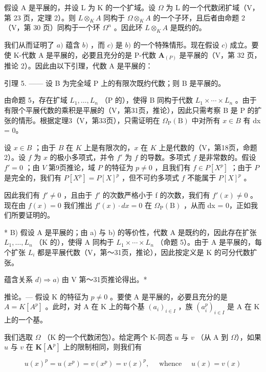 假设 A 是平展的，并设 L 为 K 的一个扩域。设 \(\Omega\) 为 L 的一个代数闭扩域（V，第 23 页，定理 2）。则 \(L \otimes_{K} A\) 同构于 \(\Omega \otimes_{K} A\) 的一个子环，且后者由命题 2（V，第 30 页）同构于一个环 \(\Omega^{n}\) 。因此环 \(L \otimes_{K} A\) 是既约的。

我们从而证明了 \(a)\) 蕴含 \(b)\) ，而 \(c)\) 是 \(b)\) 的一个特殊情形。现在假设 \(c)\) 成立。要使 K-代数 A 是平展的，必要且充分的是 P-代数 \(\mathbf{A}_{(P)}\) 是平展的（V，第 32 页，推论 2）。因此由以下引理，代数 A 是平展的：

引理 5. —— 设 B 为完全域 P 上的有限次既约代数；则 B 是平展的。

由命题 5，存在扩域 \(L_{1}, \ldots, L_{n}\) （P 的），使得 B 同构于代数 \(L_{1} \times \cdots \times L_{n}\) 。由于有限个平展代数的乘积是平展的（V，第31页，推论），因此只需考察 B 是 P 的扩张的情形。根据定理3（V，第33页），只需证明在 \(\Omega_{\mathrm{P}}(\mathrm{B})\) 中对所有 \(x \in B\) 有 dx = 0。

设 \(x \in B\) ；由于 \(B\) 在 \(K\) 上是有限次的，\(x\) 在 \(K\) 上是代数的（V，第18页，命题2）。设 \(f\) 为 \(x\) 的极小多项式，并令 \(f'\) 为 \(f\) 的导数。多项式 \(f\) 是非常数的。假设 \(f' = 0\) ；由 \(V\) 第9页推论，域 \(P\) 的特征为 \(p \neq 0\) ，且我们有 \(f \in P[X^p]\) ；由于 \(P\) 是完全的，我们有 \(P[X^p] = P[X]^p\) ，但不可约多项式 \(f\) 不能属于 \(P[X]^p\) 。

因此我们有 \(f' \neq 0\) ，且由于 \(f'\) 的次数严格小于 f 的次数，我们有 \(f'(x) \neq 0\) 。现在由 \(f(x) = 0\) 我们推出 \(f'(x) \cdot dx = 0\) 在 \(\Omega_{\mathrm{P}}(\mathrm{B})\) ，从而 dx = 0，正如我们所要证明的。

* B) 假设 A 是平展的；由 a) 与 b) 的等价性，代数 A 是既约的，因此存在扩张 \(L_{1}, \ldots, L_{n}\) （K 的），使得 A 同构于 \(L_{1} \times \cdots \times L_{n}\) （命题 5）。由于 A 是平展的，每个扩张 \(L_{i}\) 都是平展代数（V，第～31页，推论），因此按定义是 K 的可分代数扩张。

蕴含关系 \(d) \Rightarrow a)\) 由 V 第～31页推论得出。*

推论。--- 假设 K 的特征为 \(p \neq 0\) 。要使 A 是平展的，必要且充分的是 \(A = K[A^{p}]\) 。此时，对 A 在 K 上的每个基 \((a_{i})_{i \in I}\) ，族 \((a_{i}^{p})_{i \in I}\) 是 A 在 K 上的一个基。

我们选取 \(\Omega\) （K 的一个代数闭包）。给定两个 K-同态 \(u\) 与 \(v\) （从 A 到 \(\Omega\)），如果 \(u\) 与 \(v\) 在 \(\mathbf{K}[\mathbf{A}^p]\) 上的限制相同，则我们有

\[
u (x) ^ {p} = u \left(x ^ {p}\right) = v \left(x ^ {p}\right) = v (x) ^ {p}, \quad \text { whence } \quad u (x) = v (x)
\]

